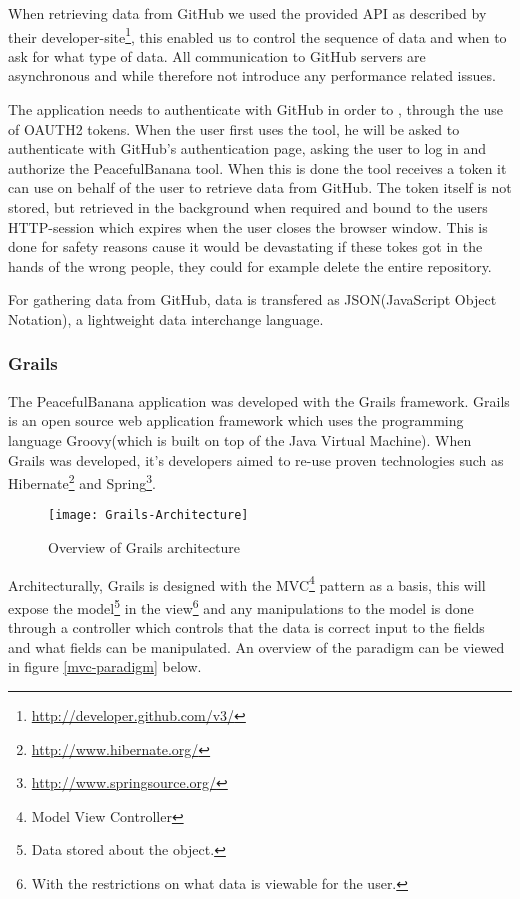 When retrieving data from GitHub we used the provided API as described by their developer-site\footnote{\url{http://developer.github.com/v3/}}, this enabled us to control the sequence of data and when to ask for what type of data. All communication to GitHub servers are asynchronous and while therefore not introduce any performance related issues. 

The application needs to authenticate with GitHub in order to , through the use of OAUTH2 tokens. When the user first uses the tool, he will be asked to authenticate with GitHub's authentication page, asking the user to log in and authorize the PeacefulBanana tool. When this is done the tool receives a token it can use on behalf of the user to retrieve data from GitHub. The token itself is not stored, but retrieved in the background when required and bound to the users HTTP-session which expires when the user closes the browser window. This is done for safety reasons cause it would be devastating if these tokes got in the hands of the wrong people, they could for example delete the entire repository.

For gathering data from GitHub, data is transfered as JSON(JavaScript Object Notation), a lightweight data interchange language. 
 
\subsubsection{Grails}
\label{sec:grails}
The PeacefulBanana application was developed with the Grails framework. 
Grails is an open source web application framework which uses the programming language Groovy(which is built on top of the Java Virtual Machine). When Grails was developed, it's developers aimed to re-use proven technologies such as Hibernate\footnote{\url{http://www.hibernate.org/}} and Spring\footnote{\url{http://www.springsource.org/}}.  

\begin{figure}[H]
\centering
    \texttt{[image: Grails-Architecture]}
\caption{Overview of Grails architecture \citep{grailsarchitecturediagram}}
\end{figure}

Architecturally, Grails is designed with the MVC\footnote{Model View Controller} pattern as a basis, this will expose the model\footnote{Data stored about the object.} in the view\footnote{With the restrictions on what data is viewable for the user.} and any manipulations to the model is done through a controller which controls that the data is correct input to the fields and what fields can be manipulated. An overview of the paradigm can be viewed in figure \ref{mvc-paradigm} below.

